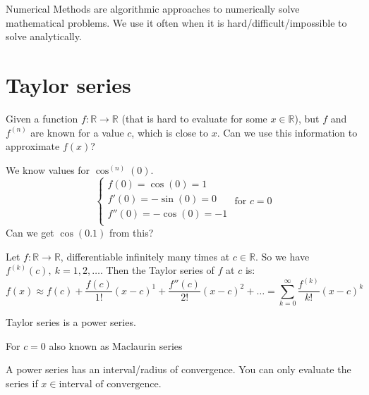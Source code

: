 
\begin{definition}
    Numerical Methods are algorithmic approaches to numerically solve mathematical problems.
    We use it often when it is hard/difficult/impossible to solve analytically.
\end{definition}

\section{Taylor series}
Given a function $f : \mathbb{R} \to \mathbb{R}$
(that is hard to evaluate for some $x \in \mathbb{R}$),
but $f$ and $f^{(n)}$ are known for a value $c$, which is close to $x$.
Can we use this information to approximate $f(x)$?

We know values for $\cos^{(n)}(0)$.
\[
    \begin{cases}
        f(0) = \cos(0) = 1\\
        f'(0) = -\sin(0) = 0\\
        f''(0) = -\cos(0) = -1\\
    \end{cases} \text{ for } c = 0
\]
Can we get $\cos(0.1)$ from this?

\begin{definition}
    Let $f : \mathbb{R} \to \mathbb{R}$, differentiable 
    infinitely many times at $c \in \mathbb{R}$.
    So we have $f^{(k)}(c),\ k=1,2,\dots $. Then the Taylor series of $f$ at $c$ is:
    \[
        f(x) \approx f(c) + \frac{f(c)}{1!}(x-c)^1 + \frac{f''(c)}{2!}(x-c)^2 + \dots =
        \sum_{k=0}^{\infty} \frac{f^{(k)}}{k!} (x - c)^k
    \]
\end{definition}

\begin{remark}
    Taylor series is a power series.
\end{remark}

\begin{remark}
    For $c = 0$ also known as Maclaurin series
\end{remark}

\begin{remark}
    A power series has an interval/radius of convergence.
    You can only evaluate the series if $x \in \text{interval of convergence}$.
\end{remark}

